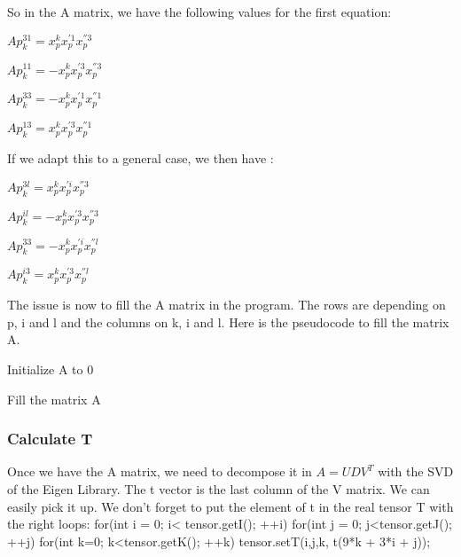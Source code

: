 \documentclass{report}
\begin{document}
So in the A matrix, we have the following values for the first equation: 
\begin{center}
$Ap_{k}^{31} = x_{p}^{k}x_{p}^{'1}x_{p}^{''3}$
\end{center}
\begin{center}
$Ap_{k}^{11} = - x_{p}^{k}x_{p}^{'3}x_{p}^{''3}$
\end{center}
\begin{center}
$Ap_{k}^{33} = -x_{p}^{k} x_{p}^{'1}x_{p}^{''1}$
\end{center}
\begin{center}
$Ap_{k}^{13} = x_{p}^{k}x_{p}^{'3}x_{p}^{''1}$
\end{center}

If we adapt this to a general case, we then have  : 
\begin{center}
$Ap_{k}^{3l} = x_{p}^{k}x_{p}^{'i}x_{p}^{''3}$
\end{center}
\begin{center}
$Ap_{k}^{il} = - x_{p}^{k}x_{p}^{'3}x_{p}^{''3}$
\end{center}
\begin{center}
$Ap_{k}^{33} = -x_{p}^{k} x_{p}^{'i}x_{p}^{''l}$
\end{center}
\begin{center}
$Ap_{k}^{i3} = x_{p}^{k}x_{p}^{'3}x_{p}^{''l}$
\end{center}


The issue is now to fill the A matrix in the program. The rows are depending on p, i and l and the columns on k, i and l. Here is the pseudocode to fill the matrix A. 

Initialize A to 0
\begin{algorithm}
\SetLine
\caption{Fill the matrix A}
\SetLine
{}
\end{algorithm}
\subsubsection{Calculate T}
Once we have the A matrix, we need to decompose it in $A=UDV^{T}$ with the SVD of the Eigen Library. The t vector is the last column of the V matrix. We can easily pick it up. 
We don't forget to put the element of t in the real tensor T with the right loops: 
for(int i = 0; i< tensor.getI(); ++i) {
      for(int j = 0; j<tensor.getJ(); ++j) {
        for(int k=0; k<tensor.getK(); ++k) {
          tensor.setT(i,j,k, t(9*k + 3*i + j));
        }
      }
    }
\end{document}
